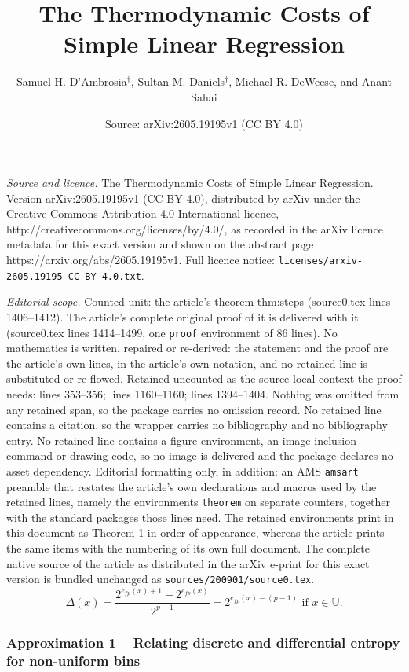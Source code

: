 \documentclass[10pt,a4paper]{amsart}
\title{The Thermodynamic Costs of Simple Linear Regression}
\author{Samuel H. D'Ambrosia$^\dagger$, Sultan M. Daniels$^\dagger$, Michael R. DeWeese, and Anant Sahai}
\date{Source: arXiv:2605.19195v1 (CC BY 4.0)}
\begin{document}
\maketitle

\noindent\emph{Source and licence.} The Thermodynamic Costs of Simple Linear Regression. Version arXiv:2605.19195v1 (CC BY 4.0), distributed by arXiv under the Creative Commons Attribution 4.0 International licence, http://creativecommons.org/licenses/by/4.0/, as recorded in the arXiv licence metadata for this exact version and shown on the abstract page https://arxiv.org/abs/2605.19195v1. Full licence notice: \texttt{licenses/arxiv-2605.19195-CC-BY-4.0.txt}.\par\smallskip

\noindent\textit{Editorial scope.} Counted unit: the article's theorem thm:steps (source0.tex lines 1406--1412). The article's complete original proof of it is delivered with it (source0.tex lines 1414--1499, one \texttt{proof} environment of 86 lines). No mathematics is written, repaired or re-derived: the statement and the proof are the article's own lines, in the article's own notation, and no retained line is substituted or re-flowed.  Retained uncounted as the source-local context the proof needs: lines 353--356; lines 1160--1160; lines 1394--1404.  Nothing was omitted from any retained span, so the package carries no omission record.  No retained line contains a citation, so the wrapper carries no bibliography and no bibliography entry.  No retained line contains a figure environment, an image-inclusion command or drawing code, so no image is delivered and the package declares no asset dependency.  Editorial formatting only, in addition: an AMS \texttt{amsart} preamble that restates the article's own declarations and macros used by the retained lines, namely the environments \texttt{theorem} on separate counters, together with the standard packages those lines need.  The retained environments print in this document as Theorem 1 in order of appearance, whereas the article prints the same items with the numbering of its own full document.  The complete native source of the article as distributed in the arXiv e-print for this exact version is bundled unchanged as \texttt{sources/200901/source0.tex}.
\begin{equation}
    \label{eq:true_bins}
    \Delta(x) = \frac{2^{e_{fp}(x)+1} - 2^{e_{fp}(x)}}{2^{p-1}}= 2^{e_{fp}(x) - (p-1)} \text{ if }x \in \mathbb{U}.
\end{equation}

\subsubsection*{Approximation 1 -- Relating discrete and differential entropy for non-uniform bins}\label{app:FPN_app1}
\end{document}
